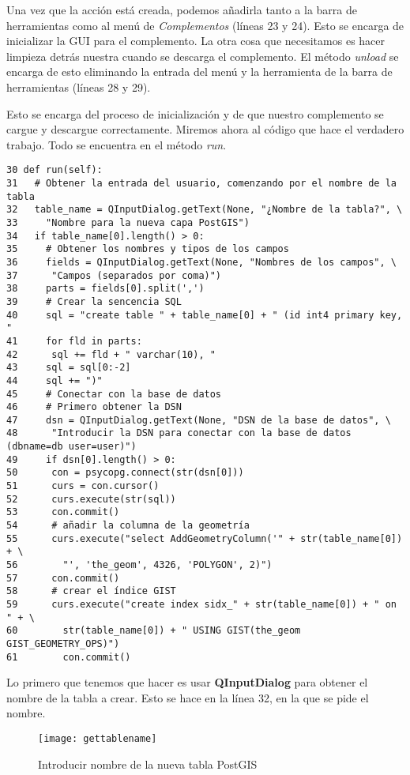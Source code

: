 Una vez que la acción está creada, podemos añadirla tanto a la barra de herramientas como al menú 
de \textsl{Complementos} (líneas 23 y 24). Esto se encarga de inicializar la GUI para el complemento. La otra 
cosa que necesitamos es hacer limpieza detrás nuestra cuando se descarga el complemento. El método 
\textsl{unload} se encarga de esto eliminando la entrada del menú y la herramienta de la barra de herramientas (líneas 28 y 29).

Esto se encarga del proceso de inicialización y de que nuestro complemento se cargue y descargue correctamente. 
Miremos ahora al código que hace el verdadero trabajo. Todo se encuentra en el método \textsl{run}.

\begin{verbatim}
30 def run(self): 
31   # Obtener la entrada del usuario, comenzando por el nombre de la tabla
32   table_name = QInputDialog.getText(None, "¿Nombre de la tabla?", \
33     "Nombre para la nueva capa PostGIS")
34   if table_name[0].length() > 0:
35     # Obtener los nombres y tipos de los campos
36     fields = QInputDialog.getText(None, "Nombres de los campos", \
37      "Campos (separados por coma)")
38     parts = fields[0].split(',')
39     # Crear la sencencia SQL
40     sql = "create table " + table_name[0] + " (id int4 primary key, "
41     for fld in parts:
42      sql += fld + " varchar(10), "
43     sql = sql[0:-2]
44     sql += ")"
45     # Conectar con la base de datos
46     # Primero obtener la DSN
47     dsn = QInputDialog.getText(None, "DSN de la base de datos", \
48      "Introducir la DSN para conectar con la base de datos (dbname=db user=user)")
49     if dsn[0].length() > 0:
50      con = psycopg.connect(str(dsn[0]))
51      curs = con.cursor()
52      curs.execute(str(sql))
53      con.commit()
54      # añadir la columna de la geometría
55      curs.execute("select AddGeometryColumn('" + str(table_name[0]) + \
56        "', 'the_geom', 4326, 'POLYGON', 2)")
57      con.commit()
58      # crear el índice GIST
59      curs.execute("create index sidx_" + str(table_name[0]) + " on " + \
60        str(table_name[0]) + " USING GIST(the_geom GIST_GEOMETRY_OPS)")
61        con.commit()
\end{verbatim}

Lo primero que tenemos que hacer es usar \textbf{QInputDialog} para obtener el nombre de la tabla a crear. 
Esto se hace en la línea 32, en la que se pide el nombre.

\begin{figure}[ht]
\begin{center}
  \caption{Introducir nombre de la nueva tabla PostGIS}\label{fig:gettablename}\smallskip
  \texttt{[image: gettablename]}
\end{center}
\end{figure}

